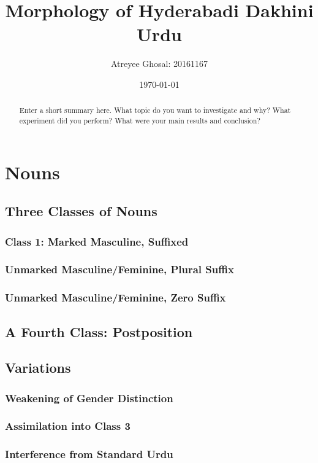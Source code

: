 \documentclass[a4paper]{article}
\title{Morphology of Hyderabadi Dakhini Urdu}
\author{Atreyee Ghosal: 20161167}
\date{\today}
\begin{document}
\maketitle

\begin{abstract}
Enter a short summary here. What topic do you want to investigate and why? What experiment did you perform? What were your main results and conclusion?
\end{abstract}

\section{Nouns}

\subsection{Three Classes of Nouns}

\subsubsection{Class 1: Marked Masculine, Suffixed}
\subsubsection{Unmarked Masculine/Feminine, Plural Suffix}
\subsubsection{Unmarked Masculine/Feminine, Zero Suffix}

\subsection{A Fourth Class: Postposition}

\subsection{Variations}

\subsubsection{Weakening of Gender Distinction}
\subsubsection{Assimilation into Class 3}
\subsubsection{Interference from Standard Urdu}
\end{document}
